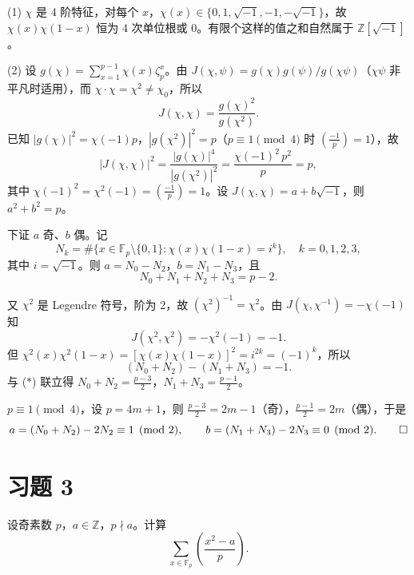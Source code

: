 \documentclass{article}
\newcommand{\leg}[2]{\left(\frac{#1}{#2}\right)}
\begin{document}
\begin{solution}
  (1) $\chi$ 是 4 阶特征，对每个 $x$，$\chi(x) \in \{0, 1, \sqrt{-1}, -1, -\sqrt{-1}\}$，故 $\chi(x)\chi(1-x)$ 恒为 4 次单位根或 0。有限个这样的值之和自然属于 $\mathbb{Z}[\sqrt{-1}]$。

  (2) 设 $g(\chi) = \sum_{x=1}^{p-1}\chi(x)\zeta_p^x$。由 $J(\chi,\psi) = g(\chi)g(\psi)/g(\chi\psi)$（$\chi\psi$ 非平凡时适用），而 $\chi\cdot\chi = \chi^2 \neq \chi_0$，所以
  \[
    J(\chi,\chi) = \frac{g(\chi)^2}{g(\chi^2)}.
  \]
  已知 $|g(\chi)|^2 = \chi(-1)p$，$|g(\chi^2)|^2 = p$（$p \equiv 1\!\pmod{4}$ 时 $\leg{-1}{p} = 1$），故
  \[
    |J(\chi,\chi)|^2 = \frac{|g(\chi)|^4}{|g(\chi^2)|^2} = \frac{\chi(-1)^2\,p^2}{p} = p,
  \]
  其中 $\chi(-1)^2 = \chi^2(-1) = \leg{-1}{p} = 1$。设 $J(\chi,\chi) = a + b\sqrt{-1}$，则 $a^2 + b^2 = p$。

  下证 $a$ 奇、$b$ 偶。记
  \[
    N_k = \#\{x \in \mathbb{F}_p \setminus \{0,1\} : \chi(x)\chi(1-x) = i^k\}, \quad k = 0,1,2,3,
  \]
  其中 $i = \sqrt{-1}$。则 $a = N_0 - N_2$，$b = N_1 - N_3$，且
  \[
    N_0 + N_1 + N_2 + N_3 = p - 2. \tag{$*$}
  \]

  又 $\chi^2$ 是 Legendre 符号，阶为 2，故 $(\chi^2)^{-1} = \chi^2$。由 $J(\chi,\chi^{-1}) = -\chi(-1)$ 知
  \[
    J(\chi^2,\chi^2) = -\chi^2(-1) = -1.
  \]
  但 $\chi^2(x)\chi^2(1-x) = [\chi(x)\chi(1-x)]^2 = i^{2k} = (-1)^k$，所以
  \[
    (N_0 + N_2) - (N_1 + N_3) = -1.
  \]
  与 ($*$) 联立得 $N_0 + N_2 = \frac{p-3}{2}$，$N_1 + N_3 = \frac{p-1}{2}$。

  $p \equiv 1 \pmod{4}$，设 $p = 4m+1$，则 $\frac{p-3}{2} = 2m-1$（奇），$\frac{p-1}{2} = 2m$（偶），于是
  \[
    a = (N_0 + N_2) - 2N_2 \equiv 1 \pmod{2}, \qquad
    b = (N_1 + N_3) - 2N_3 \equiv 0 \pmod{2}. \qedhere
  \]
\end{solution}

\section{习题 3}

设奇素数 $p$，$a \in \mathbb{Z}$，$p \nmid a$。计算
\[
  \sum_{x \in \mathbb{F}_p} \leg{x^2 - a}{p}.
\]
\end{document}
